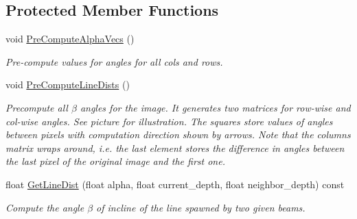 \subsection*{Protected Member Functions}
\begin{DoxyCompactItemize}
\item 
\hypertarget{classdepth__clustering_1_1LineDistDiffPrecomputed_a9e52e2a94d9f92567953a765475d62a0}{void \hyperlink{classdepth__clustering_1_1LineDistDiffPrecomputed_a9e52e2a94d9f92567953a765475d62a0}{Pre\-Compute\-Alpha\-Vecs} ()}\label{classdepth__clustering_1_1LineDistDiffPrecomputed_a9e52e2a94d9f92567953a765475d62a0}

\begin{DoxyCompactList}\small\item\em Pre-\/compute values for angles for all cols and rows. \end{DoxyCompactList}\item 
void \hyperlink{classdepth__clustering_1_1LineDistDiffPrecomputed_a9d0211af30be1f60ef4e8db570128a7b}{Pre\-Compute\-Line\-Dists} ()
\begin{DoxyCompactList}\small\item\em Precompute all $\beta$ angles for the image. It generates two matrices for row-\/wise and col-\/wise angles. See picture for illustration. The squares store values of angles between pixels with computation direction shown by arrows. Note that the columns matrix wraps around, i.\-e. the last element stores the difference in angles between the last pixel of the original image and the first one. \end{DoxyCompactList}\item 
float \hyperlink{classdepth__clustering_1_1LineDistDiffPrecomputed_a77df0f089f743ee9b586a7eb369c0257}{Get\-Line\-Dist} (float alpha, float current\-\_\-depth, float neighbor\-\_\-depth) const 
\begin{DoxyCompactList}\small\item\em Compute the angle $\beta$ of incline of the line spawned by two given beams. \end{DoxyCompactList}\end{DoxyCompactItemize}
